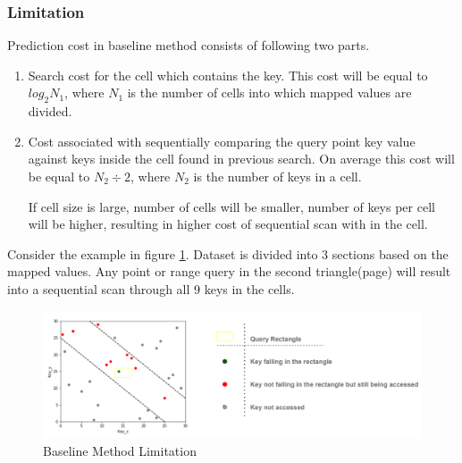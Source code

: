 \subsubsection{Limitation}

Prediction cost in baseline method consists of following two parts.

\begin{enumerate}
	\item Search cost for the cell which contains the key. This cost will be equal to $log_{2}N_{1}$, where $N_{1}$ is the number of cells into which mapped values are divided.
	
	\item Cost associated with sequentially comparing the query point key value against keys inside the cell found in previous search. On average this cost will be equal to $N_{2}\div2$, where $N_{2}$ is the number of keys in a cell.   
	
If cell size is large, number of cells will be smaller, number of keys per cell will be higher, resulting in higher cost of sequential scan with in the cell. 
\end{enumerate}
Consider the example in figure \ref{fig:BaseLine_Method_Limitation}. Dataset is divided into 3 sections based on the mapped values. Any point or range query in the second triangle(page) will result into a sequential scan through all 9 keys in the cells.

\begin{figure}[t]
    \centering
    \includegraphics[width=1\textwidth]{graphs/Lisa_Baseline_Model_Limitation.png}
    \caption{Baseline Method Limitation }
    \label{fig:BaseLine_Method_Limitation}
\end{figure}
